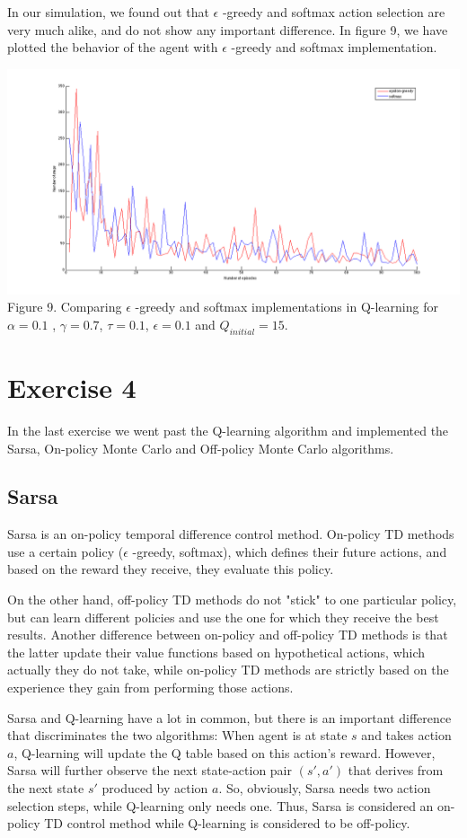 \documentclass[a4paper,11pt]{article}
\begin{document}
In our simulation, we found out that $\epsilon$ -greedy and softmax action selection are very much alike, and do not show any important difference. In figure 9, we have plotted the behavior of the agent with $\epsilon$ -greedy and softmax implementation.

\begin{center}
\includegraphics[width=1.0\textwidth,height=0.4\textheight]{s1e1.png}
\label{Figure 1}
Figure 9. Comparing $\epsilon$ -greedy and softmax implementations in Q-learning for $\alpha = 0.1$ , $\gamma = 0.7$, $\tau = 0.1$, $\epsilon = 0.1$ and $Q_{initial} = 15$.
\end{center}
\section*{Exercise 4}
In the last exercise we went past the Q-learning algorithm and implemented the Sarsa, On-policy Monte Carlo and Off-policy Monte Carlo algorithms. 	
\subsection*{Sarsa}
Sarsa is an on-policy temporal difference control method. On-policy TD methods use a certain policy ($\epsilon$ -greedy, softmax), which defines their future actions, and based on the reward they receive, they evaluate this policy.

On the other hand, off-policy TD methods do not "stick" to one particular policy, but can learn different policies and use the one for which they receive the best results. Another difference between on-policy and off-policy TD methods is that the latter update their value functions based on hypothetical actions, which actually they do not take, while on-policy TD methods are strictly based on the experience they gain from performing those actions.

Sarsa and Q-learning have a lot in common, but there is an important difference that discriminates the two algorithms: When agent is at state $s$ and takes action $a$, Q-learning will update the Q table based on this action's reward. However, Sarsa will further observe the next state-action pair $(s',a')$ that derives from the next state $s'$ produced by action $a$. So, obviously, Sarsa needs two action selection steps, while Q-learning only needs one. Thus, Sarsa is considered an on-policy TD control method while Q-learning is considered to be off-policy.
\end{document}
